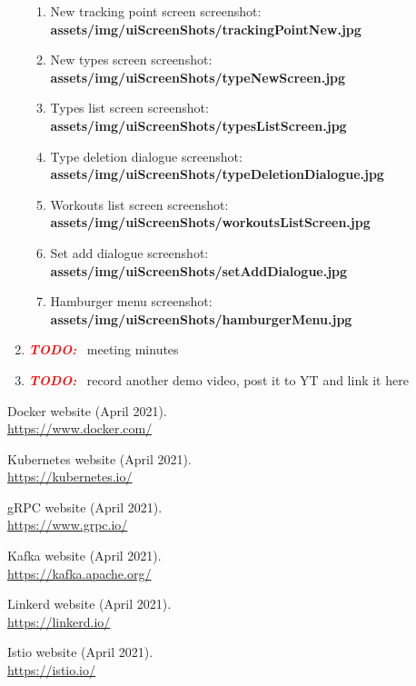 \documentclass{article}
\newcommand{\TODO}{\textbf{\textit{\textcolor{red}{TODO:}}} }
\begin{document}
\begin{multicols}{2}
\begin{enumerate}
\begin{enumerate}
      \item New tracking point screen screenshot: \textbf{assets/img/uiScreenShots/trackingPointNew.jpg}\\
      \item New types screen screenshot: \textbf{assets/img/uiScreenShots/typeNewScreen.jpg}\\
      \item Types list screen screenshot: \textbf{assets/img/uiScreenShots/typesListScreen.jpg}\\
      \item Type deletion dialogue screenshot: \textbf{assets/img/uiScreenShots/typeDeletionDialogue.jpg}\\
      \item Workouts list screen screenshot: \textbf{assets/img/uiScreenShots/workoutsListScreen.jpg}\\
      \item Set add dialogue screenshot: \textbf{assets/img/uiScreenShots/setAddDialogue.jpg}\\
      \item Hamburger menu screenshot: \textbf{assets/img/uiScreenShots/hamburgerMenu.jpg}\\
    \end{enumerate}
  \item \TODO~meeting minutes
  \item \TODO~record another demo video, post it to YT and link it here
\end{enumerate}

\newpage
\begin{thebibliography}{9}

  Docker website (April 2021).\\
  \url{https://www.docker.com/}

  Kubernetes website (April 2021).\\
  \url{https://kubernetes.io/}

  gRPC website (April 2021).\\
  \url{https://www.grpc.io/}

  Kafka website (April 2021).\\
  \url{https://kafka.apache.org/}

  Linkerd website (April 2021).\\
  \url{https://linkerd.io/}

  Istio website (April 2021).\\
  \url{https://istio.io/}
  

\end{thebibliography}
\end{multicols}
\end{document}
